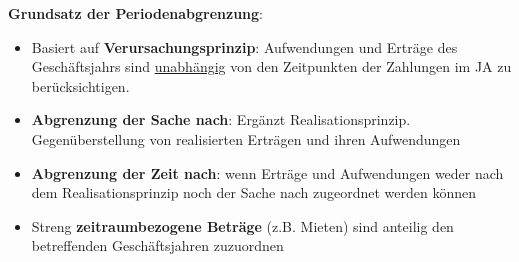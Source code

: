 \textbf{Grundsatz der Periodenabgrenzung}:
\begin{itemize}
	\item Basiert auf \textbf{Verursachungsprinzip}: Aufwendungen und Erträge des Geschäftsjahrs sind \underline{unabhängig} von den Zeitpunkten der Zahlungen im JA zu berücksichtigen.
	\item \textbf{Abgrenzung der Sache nach}: Ergänzt Realisationsprinzip. Gegenüberstellung von realisierten Erträgen und ihren Aufwendungen
	\item \textbf{Abgrenzung der Zeit nach}: wenn Erträge und Aufwendungen weder nach dem Realisationsprinzip noch der Sache nach zugeordnet werden können
	\item Streng \textbf{zeitraumbezogene Beträge} (z.B. Mieten) sind anteilig den betreffenden Geschäftsjahren zuzuordnen
\end{itemize}